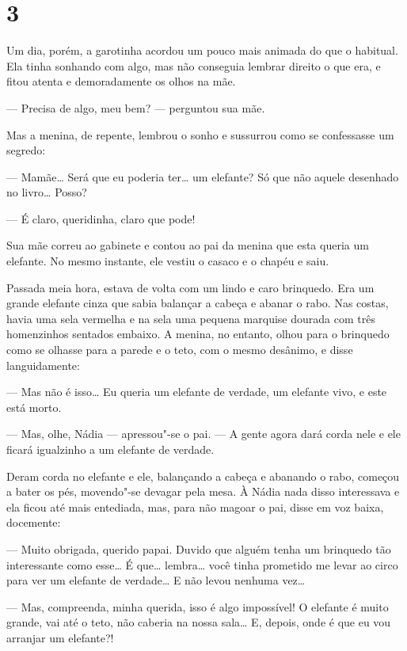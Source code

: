 \section{3}

Um dia, porém, a garotinha acordou um pouco mais animada do que o
habitual. Ela tinha sonhando com algo, mas não conseguia lembrar direito
o que era, e fitou atenta e demoradamente os olhos na mãe.

--- Precisa de algo, meu bem? --- perguntou sua mãe.

Mas a menina, de repente, lembrou o sonho e sussurrou como se
confessasse um segredo:

--- Mamãe\ldots{} Será que eu poderia ter\ldots{} um elefante? Só que não aquele
desenhado no livro\ldots{} Posso?

--- É claro, queridinha, claro que pode!

Sua mãe correu ao gabinete e contou ao pai da menina que esta queria um
elefante. No mesmo instante, ele vestiu o casaco e o chapéu e saiu.

Passada meia hora, estava de volta com um lindo e caro brinquedo. Era um
grande elefante cinza que sabia balançar a cabeça e abanar o rabo. Nas
costas, havia uma sela vermelha e na sela uma pequena marquise dourada
com três homenzinhos sentados embaixo. A menina, no entanto, olhou para
o brinquedo como se olhasse para a parede e o teto, com o mesmo
desânimo, e disse languidamente:

--- Mas não é isso\ldots{} Eu queria um elefante de verdade, um elefante
vivo, e este está morto.

--- Mas, olhe, Nádia --- apressou"-se o pai. --- A gente agora dará corda
nele e ele ficará igualzinho a um elefante de verdade.

Deram corda no elefante e ele, balançando a cabeça e abanando o rabo,
começou a bater os pés, movendo"-se devagar pela mesa. À Nádia nada
disso interessava e ela ficou até mais entediada, mas, para não magoar
o pai, disse em voz baixa, docemente:

--- Muito obrigada, querido papai. Duvido que alguém tenha um brinquedo
tão interessante como esse\ldots{} É que\ldots{} lembra\ldots{} você tinha prometido me
levar ao circo para ver um elefante de verdade\ldots{} E não levou nenhuma
vez\ldots{}

--- Mas, compreenda, minha querida, isso é algo impossível! O elefante
é muito grande, vai até o teto, não caberia na nossa sala\ldots{} E, depois,
onde é que eu vou arranjar um elefante?!

